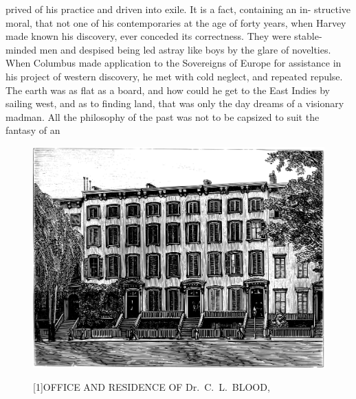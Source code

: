 \documentclass[10pt]{article}
\begin{document}
\begin{multicols}{3}
prived of his practice and driven into exile. It is a fact, containing an in-\linebreak
structive moral, that not one of his contemporaries at the age of forty years,\linebreak
when Harvey made known his discovery, ever conceded its correctness.\linebreak
They were stable-minded men and despised being led astray like boys by\linebreak
the glare of novelties. When Columbus made application to the Sovereigns\linebreak
of Europe for assistance in his project of western discovery, he met\linebreak
with cold neglect, and repeated repulse. The earth was as flat as a board,\linebreak
and how could he get to the East Indies by sailing west, and as to finding\linebreak
land, that was only the day dreams of a visionary madman. All the\linebreak
philosophy of the past was not to be capsized to suit the fantasy of an
\begin{figure}

\centering

\vspace{7mm}

\hspace{-6mm}\includegraphics[width=207mm]{Office_and_residence_of_Dr_C_L_Blood.pdf}

\Large \hspace{-6mm}\scalebox{1.15}[1]{OFFICE AND RESIDENCE OF Dr.~C.~L.~BLOOD,}


\end{figure}
\end{multicols}
\end{document}
